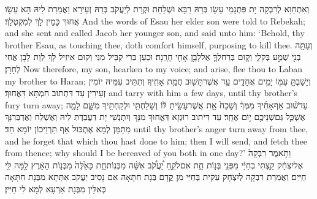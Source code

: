 {וְאִתְחַוַּא לְרִבְקָה יָת פִּתְגָמֵי עֵשָׂו בְּרַהּ רַבָּא וּשְׁלַחַת וּקְרָת לְיַעֲקֹב בְּרַהּ זְעֵירָא וַאֲמַרַת לֵיהּ הָא עֵשָׂו אֲחוּךְ כָּמֵין לָךְ לְמִקְטְלָךְ׃}
{And the words of Esau her elder son were told to Rebekah; and she sent and called Jacob her younger son, and said unto him: ‘Behold, thy brother Esau, as touching thee, doth comfort himself, purposing to kill thee.}{}
{וְעַתָּ֥ה בְנִ֖י שְׁמַ֣ע בְּקֹלִ֑י וְק֧וּם בְּרַח\maqqaf לְךָ֛ אֶל\maqqaf לָבָ֥ן אָחִ֖י חָרָֽנָה׃}
{וּכְעַן בְּרִי קַבֵּיל מִנִּי וְקוּם אִיזֵיל לָךְ לְוָת לָבָן אֲחִי לְחָרָן׃}
{Now therefore, my son, hearken to my voice; and arise, flee thou to Laban my brother to Haran;}{}
{וְיָשַׁבְתָּ֥ עִמּ֖וֹ יָמִ֣ים אֲחָדִ֑ים עַ֥ד אֲשֶׁר\maqqaf תָּשׁ֖וּב חֲמַ֥ת אָחִֽיךָ׃}
{וְתִתֵּיב עִמֵּיהּ יוֹמִין זְעֵירִין עַד דִּתְתוּב חִמְתָּא דַּאֲחוּךְ׃}
{and tarry with him a few days, until thy brother’s fury turn away;}{}
{עַד\maqqaf שׁ֨וּב אַף\maqqaf אָחִ֜יךָ מִמְּךָ֗ וְשָׁכַח֙ אֵ֣ת אֲשֶׁר\maqqaf עָשִׂ֣יתָ לּ֔וֹ וְשָׁלַחְתִּ֖י וּלְקַחְתִּ֣יךָ מִשָּׁ֑ם לָמָ֥ה אֶשְׁכַּ֛ל גַּם\maqqaf שְׁנֵיכֶ֖ם י֥וֹם אֶחָֽד׃}
{עַד דִּיתוּב רוּגְזָא דַּאֲחוּךְ מִנָּךְ וְיִתְנְשֵׁי יָת דַּעֲבַדְתְּ לֵיהּ וְאֶשְׁלַח וְאֶדְבְּרִנָּךְ מִתַּמָּן לְמָא אֶתְכּוּל אַף תַּרְוֵיכוֹן יוֹמָא חַד׃}
{until thy brother’s anger turn away from thee, and he forget that which thou hast done to him; then I will send, and fetch thee from thence; why should I be bereaved of you both in one day?’}{}
{וַתֹּ֤אמֶר רִבְקָה֙ אֶל\maqqaf יִצְחָ֔ק \footnotesize קַ֣\normalsize צְתִּי בְחַיַּ֔י מִפְּנֵ֖י בְּנ֣וֹת חֵ֑ת אִם\maqqaf לֹקֵ֣חַ יַ֠עֲקֹ֠ב אִשָּׁ֨ה מִבְּנֽוֹת\maqqaf חֵ֤ת כָּאֵ֙לֶּה֙ מִבְּנ֣וֹת הָאָ֔רֶץ לָ֥מָּה לִּ֖י חַיִּֽים׃}
{וַאֲמַרַת רִבְקָה לְיִצְחָק עַקִית בְּחַיַּי מִן קֳדָם בְּנָת חִתָּאָה אִם נָסֵיב יַעֲקֹב אִתְּתָא מִבְּנָת חִתָּאָה כְּאִלֵּין מִבְּנָת אַרְעָא לְמָא לִי חַיִּין׃}
